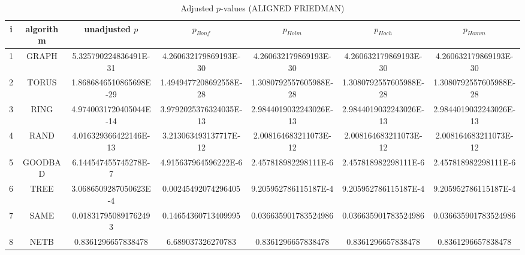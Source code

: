 \documentclass[a4paper,10pt]{article}
\begin{document}
\begin{landscape}
\begin{table}[!htp]
\centering\scriptsize
\caption{Adjusted $p$-values (ALIGNED FRIEDMAN)}
\begin{tabular}{ccccccc}
i&algorithm&unadjusted $p$&$p_{Bonf}$&$p_{Holm}$&$p_{Hoch}$&$p_{Homm}$\\
\hline
1& GRAPH&5.325790224836491E-31&4.260632179869193E-30&4.260632179869193E-30&4.260632179869193E-30&4.260632179869193E-30\\
2& TORUS&1.8686846510865698E-29&1.4949477208692558E-28&1.3080792557605988E-28&1.3080792557605988E-28&1.3080792557605988E-28\\
3& RING&4.9740031720405044E-14&3.9792025376324035E-13&2.9844019032243026E-13&2.9844019032243026E-13&2.9844019032243026E-13\\
4& RAND&4.016329366422146E-13&3.213063493137717E-12&2.008164683211073E-12&2.008164683211073E-12&2.008164683211073E-12\\
5& GOODBAD&6.144547455745278E-7&4.915637964596222E-6&2.457818982298111E-6&2.457818982298111E-6&2.457818982298111E-6\\
6& TREE&3.0686509287050623E-4&0.00245492074296405&9.205952786115187E-4&9.205952786115187E-4&9.205952786115187E-4\\
7& SAME&0.018317950891762493&0.14654360713409995&0.036635901783524986&0.036635901783524986&0.036635901783524986\\
8& NETB&0.8361296657838478&6.689037326270783&0.8361296657838478&0.8361296657838478&0.8361296657838478\\
\hline
\end{tabular}
\end{table}


\end{landscape}
\end{document}
